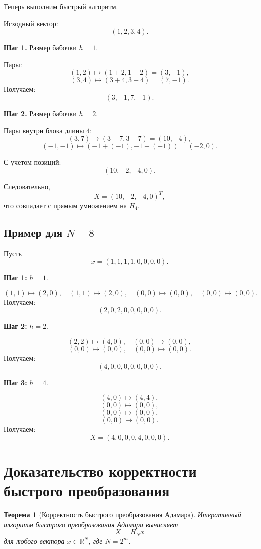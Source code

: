 \documentclass[12pt,a4paper]{article}
\newtheorem{theorem}{Теорема}
\begin{document}
Теперь выполним быстрый алгоритм.

Исходный вектор:
\[
    (1,2,3,4).
\]

\textbf{Шаг 1.} Размер бабочки $h=1$.

Пары:
\[
(1,2)\mapsto (1+2,1-2)=(3,-1),
\]
\[
(3,4)\mapsto (3+4,3-4)=(7,-1).
\]
Получаем:
\[
    (3,-1,7,-1).
\]

\textbf{Шаг 2.} Размер бабочки $h=2$.

Пары внутри блока длины $4$:
\[
(3,7)\mapsto(3+7,3-7)=(10,-4),
\]
\[
(-1,-1)\mapsto(-1+(-1),-1-(-1))=(-2,0).
\]

С учетом позиций:
\[
    (10,-2,-4,0).
\]

Следовательно,
\[
    X=(10,-2,-4,0)^T,
\]
что совпадает с прямым умножением на $H_4$.

\subsection{Пример для $N=8$}

Пусть
\[
    x=(1,1,1,1,0,0,0,0).
\]

\textbf{Шаг 1:} $h=1$.

\[
(1,1)\mapsto(2,0),
\quad
(1,1)\mapsto(2,0),
\quad
(0,0)\mapsto(0,0),
\quad
(0,0)\mapsto(0,0).
\]
Получаем:
\[
    (2,0,2,0,0,0,0,0).
\]

\textbf{Шаг 2:} $h=2$.

\[
(2,2)\mapsto(4,0),
\quad
(0,0)\mapsto(0,0),
\]
\[
(0,0)\mapsto(0,0),
\quad
(0,0)\mapsto(0,0).
\]
Получаем:
\[
    (4,0,0,0,0,0,0,0).
\]

\textbf{Шаг 3:} $h=4$.

\[
(4,0)\mapsto(4,4),
\]
\[
(0,0)\mapsto(0,0),
\]
\[
(0,0)\mapsto(0,0),
\]
\[
(0,0)\mapsto(0,0).
\]
Получаем:
\[
    X=(4,0,0,0,4,0,0,0).
\]

\section{Доказательство корректности быстрого преобразования}

\begin{theorem}[Корректность быстрого преобразования Адамара]
Итеративный алгоритм быстрого преобразования Адамара вычисляет
\[
    X=H_Nx
\]
для любого вектора $x\in\mathbb{R}^N$, где $N=2^m$.
\end{theorem}
\end{document}
